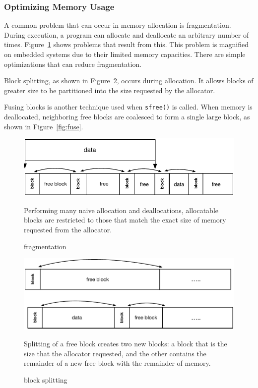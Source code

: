 \subsubsection{Optimizing Memory Usage}

A common problem that can occur in memory allocation is fragmentation. During execution, a program can allocate and deallocate an arbitrary number of times. Figure~\ref{fig:fragmentation} shows problems that result from this. This problem is magnified on embedded systems due to their limited memory capacities. There are simple optimizations that can reduce fragmentation. 

Block splitting, as shown in Figure~\ref{fig:split}, occurs during allocation. It allows blocks of greater size to be partitioned into the size requested by the allocator. 

Fusing blocks is another technique used when \texttt{sfree()} is called. When memory is deallocated, neighboring free blocks are coalesced to form a single large block, as shown in Figure~\ref{fig:fuse}. 

\begin{figure}[!htb]
\includegraphics[scale=.55]{figs/fragmentation.pdf}
\caption{fragmentation}
\label{fig:fragmentation}
Performing many naive allocation and deallocations, allocatable blocks are restricted to those that match the exact size of memory requested from the allocator.
\end{figure}

\begin{figure}[!htb]
\includegraphics[scale=.55]{figs/split.pdf}
\caption{block splitting}
Splitting of a free block creates two new blocks: a block that is the size that the allocator requested, and the other contains the remainder of a new free block with the remainder of memory.
\label{fig:split}
\end{figure}


